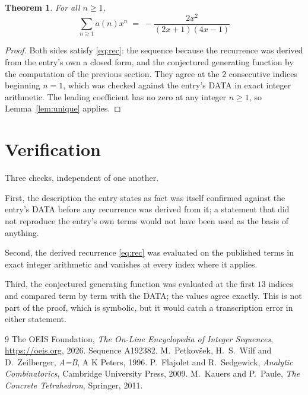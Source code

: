 \documentclass[11pt,a4paper]{article}
\theoremstyle{plain}
\newtheorem{theorem}{Theorem}
\theoremstyle{definition}
\begin{document}
\begin{theorem}
For all $n\ge 1$,
\[
\sum_{n\ge 1} a(n)x^{n} \;=\; - \frac{2 x^{2}}{\left(2 x + 1\right) \left(4 x - 1\right)}
\]
\end{theorem}

\begin{proof}
Both sides satisfy \eqref{eq:rec}: the sequence because the recurrence was derived from
the entry's own a closed form, and the conjectured generating function by the computation of the
previous section. They agree at the $2$ consecutive indices beginning
$n=1$, which was checked against the entry's DATA in exact integer arithmetic.
The leading coefficient has no zero at any integer $n\ge1$, so
Lemma~\ref{lem:unique} applies.
\end{proof}

\section{Verification}

Three checks, independent of one another.

First, the description the entry states as fact was itself confirmed against the entry's
DATA before any recurrence was derived from it; a statement that did not reproduce the
entry's own terms would not have been used as the basis of anything.

Second, the derived recurrence \eqref{eq:rec} was evaluated on the published terms in
exact integer arithmetic and vanishes at every index where it applies.

Third, the conjectured generating function was evaluated at the first $13$ indices and
compared term by term with the DATA; the values agree exactly. This is not part of the
proof, which is symbolic, but it would catch a transcription error in either statement.

\begin{thebibliography}{9}
 The OEIS Foundation, \emph{The On-Line Encyclopedia of Integer Sequences},
\url{https://oeis.org}, 2026. Sequence A192382.
 M.~Petkov\v{s}ek, H.~S.~Wilf and D.~Zeilberger, \emph{A=B}, A K Peters,
1996.
 P.~Flajolet and R.~Sedgewick, \emph{Analytic Combinatorics}, Cambridge
University Press, 2009.
 M.~Kauers and P.~Paule, \emph{The Concrete Tetrahedron}, Springer, 2011.
\end{thebibliography}
\end{document}
